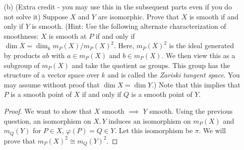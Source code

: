 \documentclass{article}
\begin{document}
\begin{itemize}
\begin{proof}
                (Part II) We just need to show that the isomorphism on $\pi : \mathcal{O}_{Q}(Y) \rightarrow \mathcal{ O}_{P}(X)$ restricts to a mapping of non-units to non-units. This is because if a non-unit maps to a unit:
                    \begin{equation*}
                         \pi ( a) = b
                    \end{equation*}
                Then $b$ has an inverse, $\pi$ is surjective, so
                    \begin{equation*}
                        \pi ( c) = b^{-1}
                    \end{equation*}
                and therefore,
                    \begin{equation*}
                        \pi ( a)\pi ( c) = 1 = \pi ( ac)
                    \end{equation*}
                Since $\pi$ is injective, $ac = 1$, so $a$ was a unit, contradiction. So non-units map to non-units.

                Then this sends $m_{Q}(Y)$ to some subset of $m_{P}(X)$ in $\mathcal{O}_{P}(X)$. Since there is an isomorphism on the local rings, we also know that there is a mapping $\mathcal{O}_{P}(X) \rightarrow \mathcal{O}_{Q}(Y)$ that restricts to sending non-units to non-units. So it sends $m_{P}(X)$ to some subset of $m_{Q}(Y)$. But the mappings are injective, which shows an isomorphism of $m_{P}(X) \cong m_{ Q}(Y)$.
            \end{proof}

        \item [(b)] (Extra credit - you may use this in the subsequent parts even if you do not solve it) Suppose $X$ and $Y$ are isomorphic. Prove that $X$ is smooth if and only if $Y$ is smooth. (Hint: Use the following alternate characterization of snoothness: $X$ is smooth at $P$ if and only if $\dim X = \dim_{ k}m_{P}(X)/m_{P}(X)^{2}$. Here, $m_{P}(X)^{2}$ is the ideal generated by products $ab$ with $a \in m_{ P}(X)$ and $b \in m_{ P}(X)$. We then view this as a subgroup of $m_{P}(X)$ and take the quotient as groups. This group has the structure of a vector space over $k$ and is called the \textit{Zariski tangent space}. You may assume without proof that $\dim X = \dim  Y$.) Note that this implies that $P$ is a smooth point of $X$ if and only if $Q$ is a smooth point of $Y$.
            \begin{proof}
                We want to show that $X$ smooth $\implies$ $Y$ smooth. Using the previous question, an isomorphism on $X, Y$ induces an isomorphism on $m_{P}(X)$ and $m_{Q}(Y)$ for $P \in X$, $\varphi ( P) = Q \in Y$. Let this isomorphism be $\pi$. We will prove that $m_{P}(X)^{2} \cong m_{ Q}(Y)^{2}$. 


\end{proof}
\end{itemize}
\end{document}
